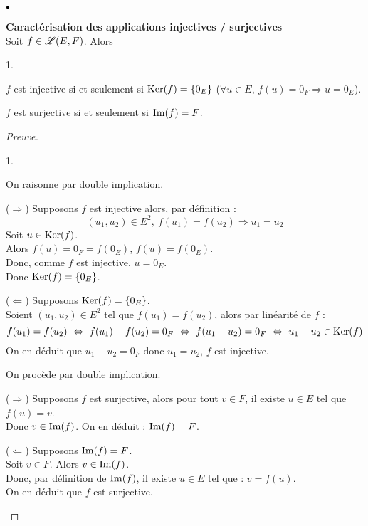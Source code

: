 \documentclass[11pt]{article}%
\begin{document}
\begin{noliste}{$\scriptstyle \bullet$}
\item {\bf Caractérisation des applications injectives / surjectives}\\
Soit $f\in\mathscr{L}(E,F)$. Alors
\begin{noliste}{1.}
\item $f$ est injective si et seulement si $\operatorname{Ker}(f) = \{0_{E}\}$ 
(\ie $\forall u \in E$, $f(u)=0_{F} \Rightarrow u = 0_{E}$).
\item $f$ est surjective si et seulement si $\operatorname{Im}(f) = F$.
\end{noliste}


\begin{proof}[Preuve]~
  \begin{noliste}{1.}
    \item On raisonne par double implication.
    \begin{noliste}{}
      \item[\quad ($\Rightarrow$)] Supposons $f$ est injective alors, 
      par définition : 
      \[
        (u_1,u_2) \in E^2, \ f(u_1) = f(u_2) \Rightarrow u_1 = u_2
      \]
      Soit $u\in\operatorname{Ker}(f)$.\\
      Alors $f(u)=0_F=f(0_E)$, \ie $f(u)=f(0_E)$.\\ 
      Donc, comme $f$ est injective, $u=0_E$.\\
      Donc $\operatorname{Ker}(f) = \{0_{E}\}$.
      
      \item[\quad ($\Leftarrow$)] Supposons $\operatorname{Ker}(f) = \{0_{E}\}$.\\ 
      Soient $(u_1,u_2) \in E^2$ tel que $f(u_1) = f(u_2)$, alors par 
      linéarité de $f$ :
      \[
        f(u_1) = f(u_2) \ \Leftrightarrow \ f(u_1) - f(u_2) = 0_{F} \ 
        \Leftrightarrow \ f(u_1-u_2)= 0_{F} \ \Leftrightarrow \ u_1-u_2 
        \in \kr(f)
      \]
    On en déduit que $u_1-u_2=0_{F}$ donc $u_1=u_2$, \ie $f$ est 
    injective.
  \end{noliste}
  
  
  \newpage
  
  
  \item On procède par double implication.
  \begin{noliste}{}
    \item[\quad ($\Rightarrow$)] Supposons $f$ est surjective, alors 
    pour tout $v \in F$, il existe $u \in E$ tel que $f(u) = v$.\\ 
    Donc $v \in \operatorname{Im}(f)$. On en déduit : $\operatorname{Im}(f) = F$.
    
    \item[\quad ($\Leftarrow$)] Supposons $\operatorname{Im}(f) = F$.\\
    Soit $v \in F$. Alors $v \in \operatorname{Im}(f)$.\\
    Donc, par définition de $\operatorname{Im}(f)$, il existe $u \in E$ tel que :
    $v=f(u)$.\\
    On en déduit que $f$ est surjective.
  \end{noliste}
\end{noliste}
\end{proof}
\end{noliste}
\end{document}

